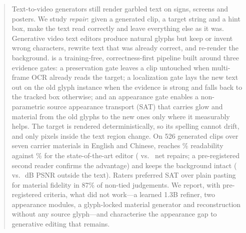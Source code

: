 \begin{abstract}
Text-to-video generators still render garbled text on signs, screens and posters. We study \emph{repair}: given a generated clip, a target string and a hint box, make the text read correctly and leave everything else as it was. Generative video text editors produce natural glyphs but keep or invent wrong characters, rewrite text that was already correct, and re-render the background. \method is a training-free, correctness-first pipeline built around three evidence gates: a preservation gate leaves a clip untouched when multi-frame OCR already reads the target; a localization gate lays the new text out on the old glyph instance when the evidence is strong and falls back to the tracked box otherwise; and an appearance gate enables a non-parametric source appearance transport (SAT) that carries glow and material from the old glyphs to the new ones only where it measurably helps. The target is rendered deterministically, so its spelling cannot drift, and only pixels inside the text region change. On 526 generated clips over seven carrier materials in English and Chinese, \method reaches \rOursRead\% readability against \rSteerRead\% for the state-of-the-art editor \steer (\rOursNet{} vs.\ \rSteerNet{} net repairs; a pre-registered second reader confirms the advantage) and keeps the background intact (\rOursBG{} vs.\ \rSteerBG\,dB PSNR outside the text). Raters preferred SAT over plain pasting for material fidelity in 87\% of non-tied judgements. We report, with pre-registered criteria, what did not work---a learned 1.3B refiner, two appearance modules, a glyph-locked material generator and reconstruction without any source glyph---and characterise the appearance gap to generative editing that remains.
\end{abstract}
